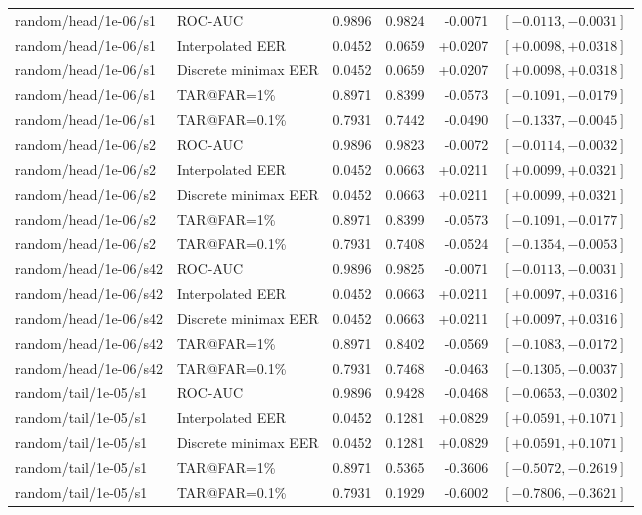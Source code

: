\documentclass[journal]{IEEEtran}
\begin{document}
\begin{table}[!t]
\begin{tabular}{@{}llrrrr@{}}
random/head/1e-06/s1 & ROC-AUC & 0.9896 & 0.9824 & -0.0071 & $[-0.0113,-0.0031]$ \\
random/head/1e-06/s1 & Interpolated EER & 0.0452 & 0.0659 & +0.0207 & $[+0.0098,+0.0318]$ \\
random/head/1e-06/s1 & Discrete minimax EER & 0.0452 & 0.0659 & +0.0207 & $[+0.0098,+0.0318]$ \\
random/head/1e-06/s1 & TAR@FAR=1\% & 0.8971 & 0.8399 & -0.0573 & $[-0.1091,-0.0179]$ \\
random/head/1e-06/s1 & TAR@FAR=0.1\% & 0.7931 & 0.7442 & -0.0490 & $[-0.1337,-0.0045]$ \\
random/head/1e-06/s2 & ROC-AUC & 0.9896 & 0.9823 & -0.0072 & $[-0.0114,-0.0032]$ \\
random/head/1e-06/s2 & Interpolated EER & 0.0452 & 0.0663 & +0.0211 & $[+0.0099,+0.0321]$ \\
random/head/1e-06/s2 & Discrete minimax EER & 0.0452 & 0.0663 & +0.0211 & $[+0.0099,+0.0321]$ \\
random/head/1e-06/s2 & TAR@FAR=1\% & 0.8971 & 0.8399 & -0.0573 & $[-0.1091,-0.0177]$ \\
random/head/1e-06/s2 & TAR@FAR=0.1\% & 0.7931 & 0.7408 & -0.0524 & $[-0.1354,-0.0053]$ \\
random/head/1e-06/s42 & ROC-AUC & 0.9896 & 0.9825 & -0.0071 & $[-0.0113,-0.0031]$ \\
random/head/1e-06/s42 & Interpolated EER & 0.0452 & 0.0663 & +0.0211 & $[+0.0097,+0.0316]$ \\
random/head/1e-06/s42 & Discrete minimax EER & 0.0452 & 0.0663 & +0.0211 & $[+0.0097,+0.0316]$ \\
random/head/1e-06/s42 & TAR@FAR=1\% & 0.8971 & 0.8402 & -0.0569 & $[-0.1083,-0.0172]$ \\
random/head/1e-06/s42 & TAR@FAR=0.1\% & 0.7931 & 0.7468 & -0.0463 & $[-0.1305,-0.0037]$ \\
random/tail/1e-05/s1 & ROC-AUC & 0.9896 & 0.9428 & -0.0468 & $[-0.0653,-0.0302]$ \\
random/tail/1e-05/s1 & Interpolated EER & 0.0452 & 0.1281 & +0.0829 & $[+0.0591,+0.1071]$ \\
random/tail/1e-05/s1 & Discrete minimax EER & 0.0452 & 0.1281 & +0.0829 & $[+0.0591,+0.1071]$ \\
random/tail/1e-05/s1 & TAR@FAR=1\% & 0.8971 & 0.5365 & -0.3606 & $[-0.5072,-0.2619]$ \\
random/tail/1e-05/s1 & TAR@FAR=0.1\% & 0.7931 & 0.1929 & -0.6002 & $[-0.7806,-0.3621]$ \\

\end{tabular}
\end{table}
\end{document}
